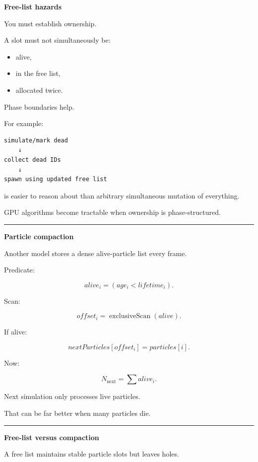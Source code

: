 \textbf{Free-list hazards}

You must establish ownership.

A slot must not simultaneously be:

\begin{itemize}
\tightlist
\item
  alive,
\item
  in the free list,
\item
  allocated twice.
\end{itemize}

Phase boundaries help.

For example:

\protect{}\label{p10-particle-phases}%
\begin{verbatim}
simulate/mark dead
    ↓
collect dead IDs
    ↓
spawn using updated free list
\end{verbatim}

is easier to reason about than arbitrary simultaneous mutation of everything.

GPU algorithms become tractable when ownership is phase-structured.

\begin{center}\rule{0.5\linewidth}{0.5pt}\end{center}

\textbf{Particle compaction}

Another model stores a dense alive-particle list every frame.

Predicate:

\[
alive_i=
(age_i<lifetime_i).
\]

Scan:

\[
offset_i=
\operatorname{exclusiveScan}(alive).
\]

If alive:

\[
nextParticles[offset_i]
=
particles[i].
\]

Now:

\[
N_{\text{next}}
=
\sum alive_i.
\]

Next simulation only processes live particles.

That can be far better when many particles die.

\begin{center}\rule{0.5\linewidth}{0.5pt}\end{center}

\textbf{Free-list versus compaction}

A free list maintains stable particle slots but leaves holes.


